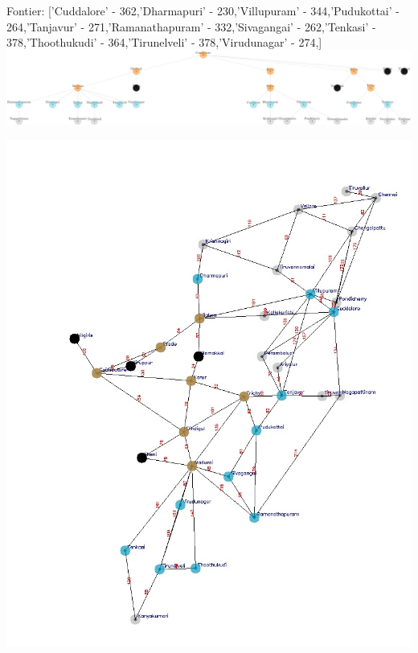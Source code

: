 \documentclass[xcolor=table]{beamer}
\begin{document}
\begin{frame}
  { \tiny Fontier: ['Cuddalore' - 362,'Dharmapuri' - 230,'Villupuram' - 344,'Pudukottai' - 264,'Tanjavur' - 271,'Ramanathapuram' - 332,'Sivagangai' - 262,'Tenkasi' - 378,'Thoothukudi' - 364,'Tirunelveli' - 378,'Virudunagar' - 274,] }
  \includegraphics[width=1\textwidth]{../UCSNodes/17-1.png}
  \begin{center}
    \includegraphics[height=0.55\textheight]{../UCSoutput/tamilUCS15.jpg}
  \end{center}
\end{frame}
\end{document}
